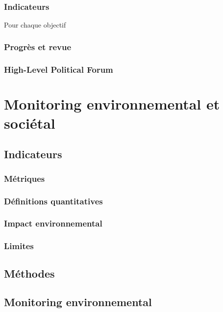 \documentclass[10pt, conference, compsocconf]{llncs}
\begin{document}
		\subsubsection{Indicateurs}
		Pour chaque objectif
		\subsubsection{Progrès et revue}
		\subsubsection{High-Level Political Forum}

\section{Monitoring environnemental et sociétal}
	\subsection{Indicateurs}
		\subsubsection{Métriques}
		\subsubsection{Définitions quantitatives}
		\subsubsection{Impact environnemental}			
		\subsubsection{Limites}
	\subsection{Méthodes}

\subsection{Monitoring environnemental}
\end{document}

